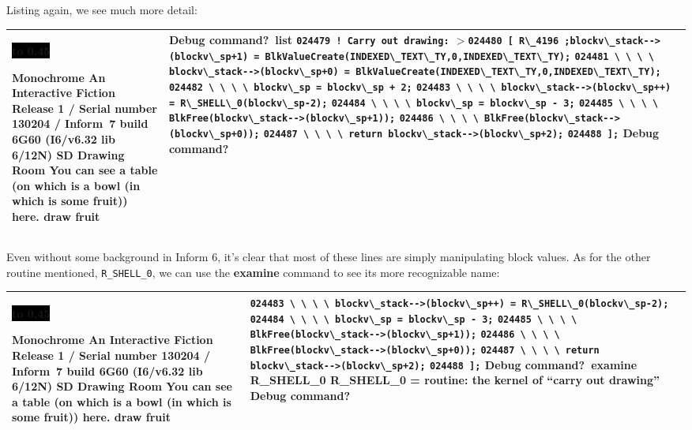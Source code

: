\documentclass{book}
\newcommand{\n}{\hspace*{\fill}\newline}
\newcommand{\terp}[2]{\begin{center}\begin{tabular}{p{0.45\textwidth}|p{0.45\textwidth}}\midrule #1&#2\\\midrule\end{tabular}\end{center}}
\newcommand{\glkheading}[1]{\textbf{#1}}
\newcommand{\glkinput}[1]{\textbf{#1}}
\newcommand{\glkstatusline}[2]{\centerline{\colorbox{black}{\hbox to 0.45\textwidth{\textcolor{white}{#1\hfil #2}}}}}
\newcommand{\storyprompt}{\raisebox{1.5pt}{\(>\)}}
\newcommand{\cursor}{\raisebox{-1.5pt}{\RectangleThin}}
\newcommand{\markedindent}{\(>\)\qquad}
\newcommand{\unmarkedindent}{\hphantom{\(>\)}\qquad}
\newcommand{\unmarkedindentb}{\qquad\hphantom{\(>\)}}
\begin{document}
Listing again, we see much more detail:

\terp{\glkstatusline{Drawing Room}{0/1}\n
  \glkheading{Monochrome}\n
  An Interactive Fiction\n
  Release 1 / Serial number 130204 / Inform~7 build 6G60 (I6/v6.32 lib 6/12N) SD\n
  \n
  \glkheading{Drawing Room}\n
  You can see a table (on which is a bowl (in which is some fruit)) here.\n
  \n
  \storyprompt\glkinput{draw fruit}}{%
  Debug command?\ \glkinput{list}\n
  \n
  \unmarkedindent \lstinline{024479 ! Carry out drawing:}\n
  \markedindent \lstinline{024480 [ R\_4196 ;blockv\_stack-->(blockv\_sp+1) = BlkValueCreate(INDEXED\_TEXT\_TY,0,INDEXED\_TEXT\_TY);}\n
  \unmarkedindent \lstinline{024481 \ \ \ \ blockv\_stack-->(blockv\_sp+0) = BlkValueCreate(INDEXED\_TEXT\_TY,0,INDEXED\_TEXT\_TY);}\n
  \unmarkedindent \lstinline{024482 \ \ \ \ blockv\_sp = blockv\_sp + 2;}\n
  \unmarkedindent \lstinline{024483 \ \ \ \ blockv\_stack-->(blockv\_sp++) = R\_SHELL\_0(blockv\_sp-2);}\n
  \unmarkedindent \lstinline{024484 \ \ \ \ blockv\_sp = blockv\_sp - 3;}\n
  \unmarkedindent \lstinline{024485 \ \ \ \ BlkFree(blockv\_stack-->(blockv\_sp+1));}\n
  \unmarkedindent \lstinline{024486 \ \ \ \ BlkFree(blockv\_stack-->(blockv\_sp+0));}\n
  \unmarkedindent \lstinline{024487 \ \ \ \ return blockv\_stack-->(blockv\_sp+2);}\n
  \unmarkedindent \lstinline{024488 ];}\n
  \n
  Debug command?\ \cursor}

Even without some background in Inform 6, it's clear that most of these lines
are simply manipulating block values.  As for the other routine mentioned,
\lstinline{R_SHELL_0}, we can use the \glkinput{examine} command to see its more
recognizable name:

\terp{\glkstatusline{Drawing Room}{0/1}\n
  \glkheading{Monochrome}\n
  An Interactive Fiction\n
  Release 1 / Serial number 130204 / Inform~7 build 6G60 (I6/v6.32 lib 6/12N) SD\n
  \n
  \glkheading{Drawing Room}\n
  You can see a table (on which is a bowl (in which is some fruit)) here.\n
  \n
  \storyprompt\glkinput{draw fruit}}{%
  \unmarkedindentb \lstinline{024483 \ \ \ \ blockv\_stack-->(blockv\_sp++) = R\_SHELL\_0(blockv\_sp-2);}\n
  \unmarkedindent \lstinline{024484 \ \ \ \ blockv\_sp = blockv\_sp - 3;}\n
  \unmarkedindent \lstinline{024485 \ \ \ \ BlkFree(blockv\_stack-->(blockv\_sp+1));}\n
  \unmarkedindent \lstinline{024486 \ \ \ \ BlkFree(blockv\_stack-->(blockv\_sp+0));}\n
  \unmarkedindent \lstinline{024487 \ \ \ \ return blockv\_stack-->(blockv\_sp+2);}\n
  \unmarkedindent \lstinline{024488 ];}\n
  \n
  Debug command?\ \glkinput{examine R\_SHELL\_0}\n
  \n
  R\_SHELL\_0 = routine: the kernel of ``carry out drawing''\n
  \n
  Debug command?\ \cursor}
\end{document}
